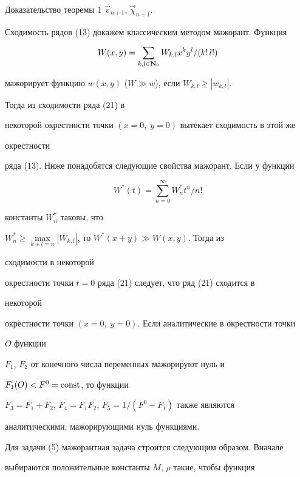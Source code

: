 \begin{pf*}{Доказательство теоремы 1}
$\Vec v_{n+1}$, $\Vec \chi_{n+1}$.





Сходимость рядов (13) докажем классическим методом мажорант. Функция


\begin{equation}


W(x,y)=\sum_{k,l\in\bold N_0}W_{k,l}x^ky^l/(k!\,l!)


\end{equation}


мажорирует функцию $w(x,y)$ ($W\gg w$), если $W_{k,l}\ge|w_{k,l}|$.


Тогда из сходимости ряда (21) в


некоторой окрестности точки $(x=0,\;y=0)$ вытекает сходимость в этой же


окрестности


ряда (13). Ниже понадобятся следующие свойства мажорант. Если у функции


\begin{equation}


W^*(t)=\sum^\infty_{n=0}W^*_nt^n/n!


\end{equation}


константы $W^*_n$ таковы, что


$W^*_n\ge\max\limits_{k+l=n}|W_{k,l}|$, то $W^*(x+y)\gg W(x,y)$. Тогда из


сходимости в некоторой


окрестности точки $t=0$ ряда (21) следует, что ряд (21) сходится в


некоторой


окрестности точки $(x=0,\;y=0)$. Если аналитические в окрестности точки


$O$ функции


$F_1$, $F_2$ от конечного числа переменных мажорируют нуль и


$F_1(O)<F^0=\operatorname{const}$, то функции


$F_3=F_1+F_2$, $F_4=F_1F_2$, $F_5=1/(F^0-F_1)$ также являются


аналитическими, мажорирующими нуль функциями.





Для задачи (5) мажорантная задача строится следующим образом. Вначале


выбираются положительные константы $M$, $\rho$ такие, чтобы функция


$$



\end{pf*}
